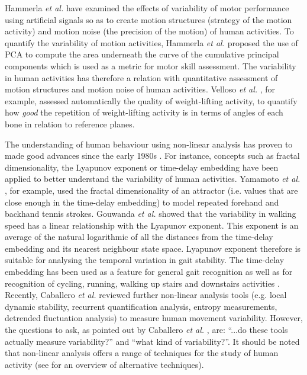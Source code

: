 \documentclass[10pt,journal,compsoc]{IEEEtran}
\begin{document}
Hammerla \emph{et al.} \cite{hammerla2011} have examined the effects of
variability of motor performance using artificial signals so as to create 
motion structures (strategy of the motion activity) and motion noise 
(the precision of the motion) of human activities. 
To quantify the variability of motion activities, Hammerla \emph{et al.} 
\cite{hammerla2011} proposed the use of PCA to compute the area underneath 
the curve of the cumulative principal components which is used as a metric for motor skill assessment.
The variability in human activities has therefore a relation with quantitative assessment
of motion structures and motion noise of human activities.
Velloso \emph{et al.} \cite{Velloso2013a, Velloso2013b}, for example, assessed automatically 
the quality of weight-lifting activity, to quantify how \textit{good} the repetition of 
weight-lifting activity is in terms of angles of each bone in relation to reference planes. 

The understanding of human behaviour using non-linear analysis 
has proven to made good advances since the early 1980s \cite{Huys2011,KantzSchreiber04}.
For instance, concepts such as fractal dimensionality, 
the Lyapunov exponent or time-delay embedding have been applied to better 
understand the variability of human activities.
Yamamoto \emph{et al.} \cite{Suzuki2013, Yamamoto2000} , for example, used the fractal 
dimensionality of an attractor (i.e. values that are close enough in the time-delay embedding)
to model repeated forehand and backhand tennis strokes.
Gouwanda \emph{et al.} \cite{Gouwanda2012} showed that the variability in walking speed has a 
linear relationship with the Lyapunov exponent. This exponent is an average of the natural 
logarithmic of all the distances from the time-delay embedding and its 
nearest neighbour state space. Lyapunov exponent therefore is suitable for analysing 
the temporal variation in gait stability. The time-delay embedding
has been used as a feature for general gait recognition \cite{Sama2013} as well as 
for recognition of cycling, running, walking up stairs and downstairs activities \cite{Frank2010}.
Recently,  Caballero \emph{et al.} \cite{Caballero2014} reviewed further non-linear analysis tools
(e.g. local dynamic stability, recurrent quantification analysis, entropy measurements,
detrended fluctuation analysis) to measure human movement variability. 
However, the questions to ask, as pointed out by Caballero \emph{et al.} \cite{Caballero2014}, 
are: ``...do these tools actually measure variability?'' and ``what kind of variability?''.
It should be noted that non-linear analysis offers a range of techniques for the study of 
human activity (see \cite{Guastello2011} for an overview of alternative techniques). 
\end{document}
